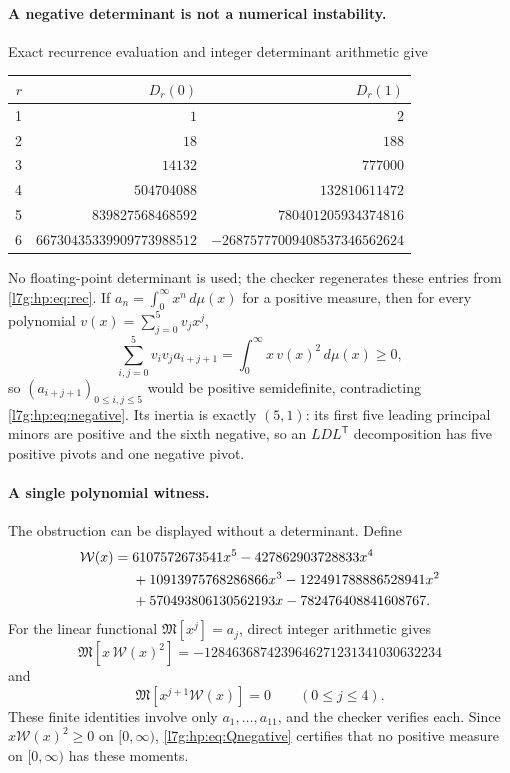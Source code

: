 \documentclass[11pt,letterpaper]{article}
\theoremstyle{remark}\newtheorem{remark}[theorem]{Remark}
\newcounter{l7gtrsavedeq}
\begin{document}
\paragraph{A negative determinant is not a numerical instability.}
Exact recurrence evaluation and integer determinant arithmetic give
\begin{center}\small
\begin{tabular}{rrr}
\toprule
$r$ & $D_r(0)$ & $D_r(1)$\\
\midrule
1 & $1$ & $2$\\
2 & $18$ & $188$\\
3 & $14132$ & $777000$\\
4 & $504704088$ & $132810611472$\\
5 & $839827568468592$ & $780401205934374816$\\
6 & $66730435339909773988512$ & $-26875777009408537346562624$\\
\bottomrule
\end{tabular}
\end{center}
No floating-point determinant is used; the checker regenerates these
entries from \eqref{l7g:hp:eq:rec}. If $a_n=\int_0^\infty x^n\,d\mu(x)$ for
a positive measure, then for every polynomial $v(x)=\sum_{j=0}^5v_jx^j$,
\[
 \sum_{i,j=0}^5v_iv_ja_{i+j+1}=\int_0^\infty x\,v(x)^2\,d\mu(x)\ge0,
\]
so $(a_{i+j+1})_{0\le i,j\le5}$ would be positive semidefinite, contradicting
\eqref{l7g:hp:eq:negative}. Its inertia is exactly $(5,1)$: its first five
leading principal minors are positive and the sixth negative, so an
$LDL^{\mathsf T}$ decomposition has five positive pivots and one negative
pivot.

\paragraph{A single polynomial witness.}
The obstruction can be displayed without a determinant. Define
\begin{align}\label{l7g:hp:eq:Qpoly}
 \mathcal W(x)={}&6107572673541x^5-427862903728833x^4\notag\\
       &+10913975768286866x^3-122491788886528941x^2\notag\\
       &+570493806130562193x-782476408841608767.
\end{align}
For the linear functional $\mathfrak M[x^j]=a_j$, direct integer
arithmetic gives
\begin{equation}\label{l7g:hp:eq:Qnegative}
 \mathfrak M[x\,\mathcal W(x)^2]=-1284636874239646271231341030632234
\end{equation}
and
\begin{equation}\label{l7g:hp:eq:Qorthogonal}
 \mathfrak M[x^{j+1}\mathcal W(x)]=0\qquad(0\le j\le4).
\end{equation}
These finite identities involve only $a_1,\dots,a_{11}$, and the checker
verifies each. Since $x\mathcal W(x)^2\ge0$ on $[0,\infty)$,
\eqref{l7g:hp:eq:Qnegative} certifies that no positive measure on
$[0,\infty)$ has these moments.
\end{document}
